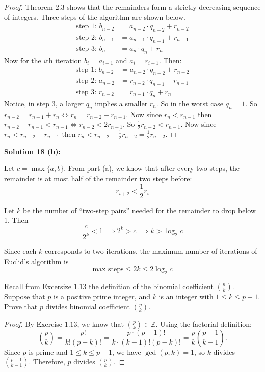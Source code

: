 \begin{proof}
    Theorem $2.3$ shows that the remainders form a strictly decreasing sequence of integers.
    Three steps of the algorithm are shown below.
    \begin{align*}
        \text{step $1$: }b_{n - 2} &= a_{n - 2} \cdot q_{n - 2} + r_{n - 2} \\
        \text{step $2$: }b_{n - 1} &= a_{n - 1} \cdot q_{n - 1} + r_{n - 1} \\
        \text{step $3$: }b_{n} &= a_{n} \cdot q_{n} + r_{n}
    \end{align*}
    Now for the $i$th iteration $b_i = a_{i - 1}$ and $a_i = r_{i - 1}$. Then:
    \begin{align*}
        \text{step $1$: }b_{n - 2} &= a_{n - 2} \cdot q_{n - 2} + r_{n - 2} \\
        \text{step $2$: }a_{n - 2} &= r_{n - 2} \cdot q_{n - 1} + r_{n - 1} \\
        \text{step $3$: }r_{n - 2} &= r_{n - 1} \cdot q_{n} + r_{n}
    \end{align*}
    Notice, in step $3$, a larger $q_n$ implies a smaller $r_n$.
    So in the worst case $q_n = 1$. So $r_{n - 2} = r_{n - 1} + r_{n} \iff r_n = r_{n - 2} - r_{n - 1}$.
    Now since $r_n < r_{n - 1}$ then $r_{n - 2} - r_{n - 1} < r_{n - 1} \iff r_{n - 2} < 2r_{n - 1}$.
    So $\frac{1}{2} r_{n - 2} < r_{n - 1}$. 
    Now since $r_n < r_{n - 2} - r_{n - 1}$ then $r_n < r_{n - 2} - \frac{1}{2} r_{n - 2} = \frac{1}{2} r_{n - 2}$.
\end{proof}

\textbf{Solution 18 (b):}

Let $c = \max\{a, b\}$.
From part (a), we know that after every two steps, the remainder is at most half of the remainder two steps before: 
\[
r_{i+2} < \frac{1}{2} r_i
\]

Let \(k\) be the number of ``two-step pairs'' needed for the remainder to drop below 1. Then
\[
\frac{c}{2^k} < 1 \implies 2^k > c \implies k > \log_2 c
\]

Since each \(k\) corresponds to two iterations, the maximum number of iterations of Euclid's algorithm is
\[
\text{max steps} \le 2k \le 2 \log_2 c
\]

\begin{tcolorbox}[title=Problem 19, breakable]
    Recall from Excersize $1.13$ the definition of the binomial coefficient 
    $\binom{n}{k}$. Suppose that $p$ is a positive prime integer, and $k$ is 
    an integer with $1 \le k \le p - 1$. Prove that $p$ divides binomial    
    coefficient $\binom{p}{k}$.
\end{tcolorbox}

\begin{proof}
By Exercise $1.13$, we know that $\binom{p}{k} \in \mathbb{Z}$.  
Using the factorial definition:
\[
\binom{p}{k} = \frac{p!}{k!(p-k)!} = \frac{p \cdot (p-1)!}{k \cdot (k-1)! (p-k)!} = \frac{p}{k} \binom{p-1}{k-1}.
\]
Since $p$ is prime and $1 \le k \le p-1$, we have $\gcd(p,k)=1$, 
so $k$ divides $\binom{p-1}{k-1}$. Therefore, $p$ divides $\binom{p}{k}$.
\end{proof}